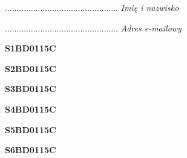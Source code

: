 \begin{turn}{90}\begin{minipage}{\linewidth} \vspace{20mm} ................................................  \textit{Imię i nazwisko}\end{minipage}\end{turn}

\begin{turn}{90}\begin{minipage}{\linewidth} \vspace{20mm} ................................................  \textit{Adres e-mailowy}\end{minipage}\end{turn}

\begin{turn}{90}\huge \begin{minipage}{\linewidth} \vspace{10mm}\textbf{S1BD0115C}\end{minipage}\end{turn}

\begin{turn}{90}\huge \begin{minipage}{\linewidth} \vspace{10mm}\textbf{S2BD0115C}\end{minipage}\end{turn}

\begin{turn}{90}\huge \begin{minipage}{\linewidth} \vspace{10mm}\textbf{S3BD0115C}\end{minipage}\end{turn}

\begin{turn}{90}\huge \begin{minipage}{\linewidth} \vspace{10mm}\textbf{S4BD0115C}\end{minipage}\end{turn}

\begin{turn}{90}\huge \begin{minipage}{\linewidth} \vspace{10mm}\textbf{S5BD0115C}\end{minipage}\end{turn}

\begin{turn}{90}\huge \begin{minipage}{\linewidth} \vspace{10mm}\textbf{S6BD0115C}\end{minipage}\end{turn}

